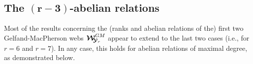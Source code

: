 \documentclass[11pt]{amsart}
\newcommand{\bk}{\bigskip}
\begin{document}
\subsection{\bf The $\boldsymbol{(r-3)}$-abelian relations}
%
%
%
Most of the results concerning the (ranks and abelian relations of the) first two Gelfand-MacPherson webs $\boldsymbol{\mathcal W}^{GM}_{\hspace{-0.1cm} \boldsymbol{\mathcal Y}_r}$ appear to extend to the last two cases (i.e., for $r = 6$ and $r = 7$). In any case, this holds for abelian relations of maximal degree, as demonstrated below.

\end{document}
